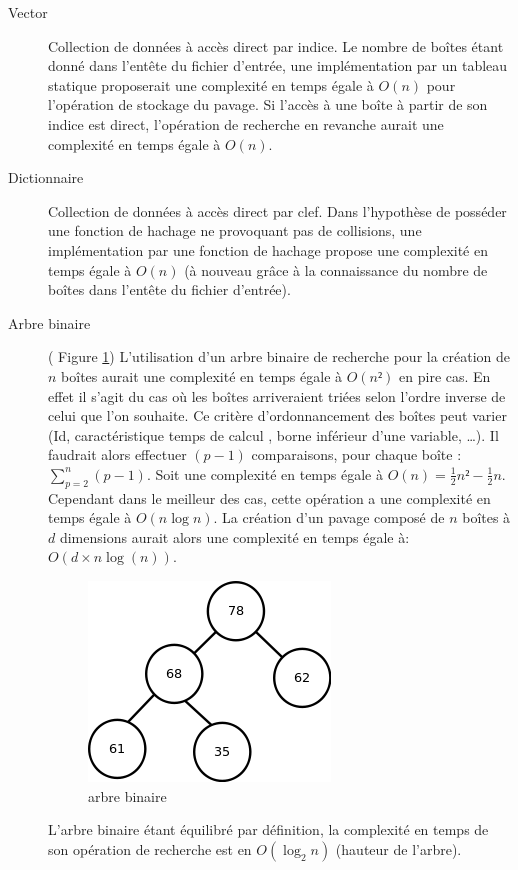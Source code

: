 \begin{description}
 \item[Vector] Collection de données à accès direct par indice. Le nombre de boîtes étant donné dans l'entête du fichier d'entrée, une implémentation par un tableau statique proposerait une complexité en temps égale à $O(n)$ pour l'opération de stockage du pavage. Si l'accès à une boîte à partir de son indice est direct, l'opération de recherche en revanche aurait une complexité en temps égale à $O(n)$. 

\item[Dictionnaire]
Collection de données à accès direct par clef. Dans l'hypothèse de posséder une fonction de hachage ne provoquant pas de collisions, une implémentation par une fonction de hachage propose une complexité en temps égale à $O(n)$ (à nouveau grâce à la connaissance du nombre de boîtes dans l'entête du fichier d'entrée).


\item[Arbre binaire](\cf{} Figure \ref{fig:ab})
L'utilisation d'un arbre binaire de recherche pour la création de $n$ boîtes aurait une complexité en temps égale à $O(n²)$ en pire cas. En effet il s'agit du cas où les boîtes arriveraient triées selon l'ordre inverse de celui que l'on souhaite. Ce critère d'ordonnancement des boîtes peut varier (Id, caractéristique \og temps de calcul \fg{}, borne inférieur d'une variable, \dots{}). Il faudrait alors effectuer $(p-1)$ comparaisons, pour chaque boîte :  $\sum_{p=2}^{n}(p-1)$. Soit une complexité en temps égale à $O(n)=\frac{1}{2}n²-\frac{1}{2}n$. Cependant dans le meilleur des cas, cette opération a une complexité en temps égale à $O(n\log{n})$. La création d'un pavage composé de $n$ boîtes à $d$ dimensions aurait alors une complexité en temps égale à: $O(d \times n\log(n))$.

\begin{figure}[htbp]
  \centering
  \includegraphics[scale=0.60]{img/binTree}
  \caption{arbre binaire}
  \label{fig:ab}
\end{figure}
L'arbre binaire étant équilibré par définition, la complexité en temps de son opération de recherche est en $O(\log_2{n})$ (hauteur de l'arbre).
   



\end{description}
